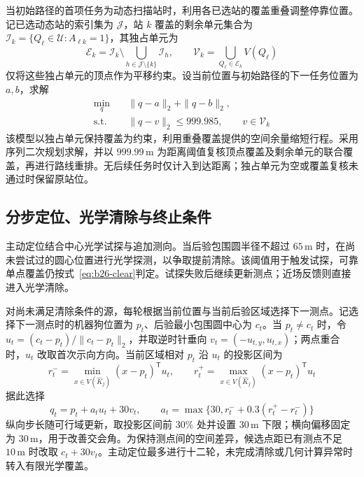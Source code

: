 \documentclass[withoutpreface,bwprint]{cumcmthesis} %
\begin{document}
当初始路径的首项任务为动态扫描站时，利用各已选站的覆盖重叠调整停靠位置。记已选动态站的索引集为 $\mathcal J$，站 $k$ 覆盖的剩余单元集合为 $\mathcal I_k=\{Q_\ell\in\mathcal U:A_{\ell k}=1\}$，其独占单元为
\begin{equation}
 \mathcal E_k=\mathcal I_k\setminus
 \bigcup_{h\in\mathcal J\setminus\{k\}}\mathcal I_h,
 \qquad
 \mathcal V_k=\bigcup_{Q_\ell\in\mathcal E_k}V(Q_\ell)
 \label{eq:b26-q3-exclusive}
\end{equation}
仅将这些独占单元的顶点作为平移约束。设当前位置与初始路径的下一任务位置为 $a,b$，求解
\begin{equation}
 \begin{aligned}
 \min_q\quad&\|q-a\|_2+\|q-b\|_2,\\
 \text{s.t.}\quad&\|q-v\|_2\leq999.985,\qquad v\in\mathcal V_k
 \end{aligned}\label{eq:b26-survey-shift}
\end{equation}
该模型以独占单元保持覆盖为约束，利用重叠覆盖提供的空间余量缩短行程。采用序列二次规划求解，并以 $999.99\,\mathrm m$ 为距离阈值复核顶点覆盖及剩余单元的联合覆盖，再进行路线重排。无后续任务时仅计入到达距离；独占单元为空或覆盖复核未通过时保留原站位。

\subsection{分步定位、光学清除与终止条件}
主动定位结合中心光学试探与追加测向。当后验包围圆半径不超过 $65\,\mathrm m$ 时，在尚未尝试过的圆心位置进行光学探测，以争取提前清除。该阈值用于触发试探，可靠单点覆盖仍按式~\eqref{eq:b26-clear}判定。试探失败后继续更新测点；近场反馈则直接进入光学清除。

对尚未满足清除条件的源，每轮根据当前位置与当前后验区域选择下一测点。记选择下一测点时的机器狗位置为 $p_t$、后验最小包围圆中心为 $c_t$。当 $p_t\ne c_t$ 时，令 $u_t=(c_t-p_t)/\|c_t-p_t\|_2$，并取逆时针垂向 $v_t=(-u_{t,y},u_{t,x})$；两点重合时，$u_t$ 改取首次示向方向。当前区域相对 $p_t$ 沿 $u_t$ 的投影区间为
\begin{equation}
 r_t^- =\min_{x\in V(\widehat K_j)}(x-p_t)^{\mathsf T}u_t,
 \qquad
 r_t^+ =\max_{x\in V(\widehat K_j)}(x-p_t)^{\mathsf T}u_t
 \label{eq:b26-q3-projection}
\end{equation}
据此选择
\begin{equation}
 q_t=p_t+a_tu_t+30v_t,\qquad
 a_t=\max\{30,r_t^-+0.3(r_t^+-r_t^-)\}
 \label{eq:b26-q3-step}
\end{equation}
纵向步长随可行域更新，取投影区间前 $30\%$ 处并设置 $30\,\mathrm m$ 下限；横向偏移固定为 $30\,\mathrm m$，用于改善交会角。为保持测点间的空间差异，候选点距已有测点不足 $10\,\mathrm m$ 时改取 $c_t+30v_t$。主动定位最多进行十二轮，未完成清除或几何计算异常时转入有限光学覆盖。
\end{document}

